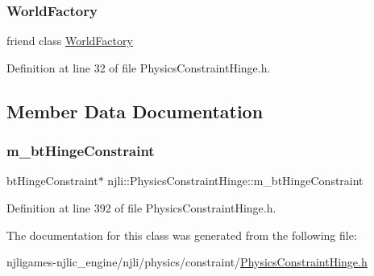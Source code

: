 \subsubsection{\texorpdfstring{World\+Factory}{WorldFactory}}
{\footnotesize\ttfamily friend class \mbox{\hyperlink{classnjli_1_1_world_factory}{World\+Factory}}\hspace{0.3cm}{\ttfamily [friend]}}



Definition at line 32 of file Physics\+Constraint\+Hinge.\+h.



\subsection{Member Data Documentation}
\mbox{\label{classnjli_1_1_physics_constraint_hinge_aeb5449d17ea4a80fa37ac059e3fba661}} 
\subsubsection{\texorpdfstring{m\+\_\+bt\+Hinge\+Constraint}{m\_btHingeConstraint}}
{\footnotesize\ttfamily bt\+Hinge\+Constraint$\ast$ njli\+::\+Physics\+Constraint\+Hinge\+::m\+\_\+bt\+Hinge\+Constraint\hspace{0.3cm}{\ttfamily [private]}}



Definition at line 392 of file Physics\+Constraint\+Hinge.\+h.



The documentation for this class was generated from the following file\+:\begin{DoxyCompactItemize}
\item 
njligames-\/njlic\+\_\+engine/njli/physics/constraint/\mbox{\hyperlink{_physics_constraint_hinge_8h}{Physics\+Constraint\+Hinge.\+h}}\end{DoxyCompactItemize}
